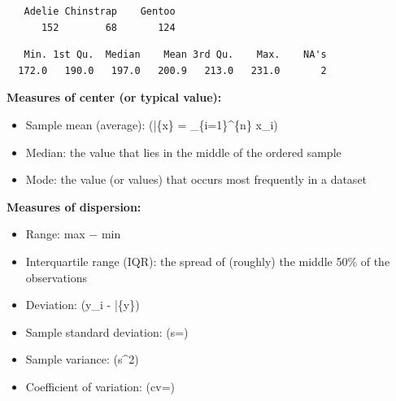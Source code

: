 \documentclass[
  letterpaper,
  DIV=11,
  numbers=noendperiod]{scrreprt}
\newenvironment{Shaded}{\begin{snugshade}}{\end{snugshade}}
\newcommand{\CommentTok}[1]{\textcolor[rgb]{0.37,0.37,0.37}{#1}}
\newcommand{\FunctionTok}[1]{\textcolor[rgb]{0.28,0.35,0.67}{#1}}
\newcommand{\NormalTok}[1]{\textcolor[rgb]{0.00,0.23,0.31}{#1}}
\newcommand{\SpecialCharTok}[1]{\textcolor[rgb]{0.37,0.37,0.37}{#1}}
\providecommand{\tightlist}{%
  \setlength{\itemsep}{0pt}\setlength{\parskip}{0pt}}
\begin{document}
\begin{Shaded}
\end{Shaded}

\begin{verbatim}
   Adelie Chinstrap    Gentoo 
      152        68       124 
\end{verbatim}

\begin{Shaded}
\end{Shaded}

\begin{verbatim}
   Min. 1st Qu.  Median    Mean 3rd Qu.    Max.    NA's 
  172.0   190.0   197.0   200.9   213.0   231.0       2 
\end{verbatim}

\begin{Shaded}
\end{Shaded}

\textbf{Measures of center (or typical value):}

\begin{itemize}
\tightlist
\item
  Sample mean (average): (\bar\{x\} = \sum\_\{i=1\}\^{}\{n\}
  x\_i)
\item
  Median: the value that lies in the middle of the ordered sample
\item
  Mode: the value (or values) that occurs most frequently in a dataset
\end{itemize}

\textbf{Measures of dispersion:}

\begin{itemize}
\tightlist
\item
  Range: max − min\\
\item
  Interquartile range (IQR): the spread of (roughly) the middle 50\% of
  the observations\\
\item
  Deviation: (y\_i - \bar\{y\})\\
\item
  Sample standard deviation:
  (s=)\\
\item
  Sample variance: (s\^{}2)\\
\item
  Coefficient of variation: (cv=)
\end{itemize}
\end{document}
